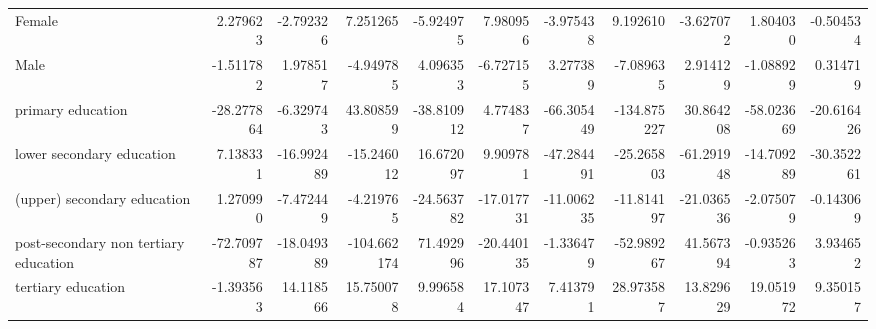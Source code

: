 \documentclass[11pt]{article}
\begin{document}
\begin{table}[!htbp]
{\begin{tabular}{lrrrrrrrrrr}
Female                                &    2.279623 &  -2.792326 &    7.251265 &  -5.924975 &   7.980956 &  -3.975438 &    9.192610 &  -3.627072 &   1.804030 &  -0.504534 \\
Male                                  &   -1.511782 &   1.978517 &   -4.949785 &   4.096353 &  -6.727155 &   3.277389 &   -7.089635 &   2.914129 &  -1.088929 &   0.314719 \\
primary education                     &  -28.277864 &  -6.329743 &   43.808599 & -38.810912 &   4.774837 & -66.305449 & -134.875227 &  30.864208 & -58.023669 & -20.616426 \\
lower secondary education             &    7.138331 & -16.992489 &  -15.246012 &  16.672097 &   9.909781 & -47.284491 &  -25.265803 & -61.291948 & -14.709289 & -30.352261 \\
(upper) secondary education           &    1.270990 &  -7.472449 &   -4.219765 & -24.563782 & -17.017731 & -11.006235 &  -11.814197 & -21.036536 &  -2.075079 &  -0.143069 \\
post-secondary non tertiary education &  -72.709787 & -18.049389 & -104.662174 &  71.492996 & -20.440135 &  -1.336479 &  -52.989267 &  41.567394 &  -0.935263 &   3.934652 \\
tertiary education                    &   -1.393563 &  14.118566 &   15.750078 &   9.996584 &  17.107347 &   7.413791 &   28.973587 &  13.829629 &  19.051972 &   9.350157 \\
\bottomrule
\end{tabular}
}
\end{table}
\end{document}
